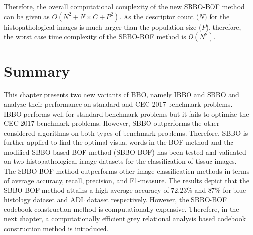 Therefore, the overall computational complexity of the new SBBO-BOF method can be given as $O(N^2 +N \times C+P^2)$. As the descriptor count ($N$) for the histopathological images is much larger than the population size ($P$), therefore, the worst case time complexity of the SBBO-BOF method is $O(N^2)$.


 \section{Summary}\label{sec:5}
This chapter presents two new variants of BBO, namely IBBO and SBBO and analyze their performance on standard and CEC 2017 benchmark problems. IBBO performs well for standard benchmark problems but it fails to optimize the CEC 2017 benchmark problems. However, SBBO outperforms the other considered algorithms on both types of benchmark problems. Therefore, SBBO is further applied to find the optimal visual words in the BOF method and the modified SBBO based BOF method (SBBO-BOF) has been tested and validated on two histopathological image datasets for the classification of tissue images. The SBBO-BOF method outperforms other image classification methods in terms of average accuracy, recall, precision, and F1-measure. The results depict that the SBBO-BOF method attains a high average accuracy of $72.23\%$ and $87\%$ for blue histology dataset and ADL dataset respectively. However, the SBBO-BOF codebook construction method is computationally expensive. Therefore, in the next chapter,  a computationally efficient grey relational analysis based codebook construction method is introduced.







